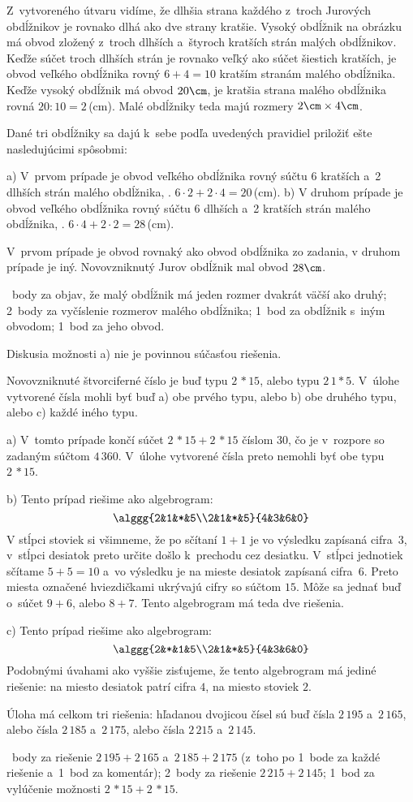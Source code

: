 {%
Z~vytvoreného útvaru vidíme, že dlhšia strana každého z~troch Jurových
obdĺžnikov je rovnako dlhá ako dve strany kratšie.
Vysoký obdĺžnik na obrázku má obvod zložený z~troch dlhších a~štyroch kratších strán
malých obdĺžnikov.
Keďže súčet troch dlhších strán je rovnako veľký ako súčet šiestich kratších,
je obvod veľkého obdĺžnika rovný $6+4=10$ kratším stranám malého obdĺžnika.
Keďže vysoký obdĺžnik má obvod $20\cm$, je kratšia strana malého obdĺžnika
rovná $20:10=2$\,(cm).
Malé obdĺžniky teda majú rozmery $2\cm\times4\cm$.

Dané tri obdĺžniky sa dajú k~sebe podľa uvedených pravidiel priložiť ešte
nasledujúcimi spôsobmi:
%

\ite a)
V~prvom prípade je obvod veľkého obdĺžnika rovný súčtu 6 kratších a~2
dlhších strán malého obdĺžnika, \tj. $6\cdot2+2\cdot4=20$\,(cm).
\ite b)
V druhom prípade je obvod veľkého obdĺžnika rovný súčtu 6 dlhších a~2
kratších strán malého obdĺžnika, \tj. $6\cdot4+2\cdot2=28$\,(cm).

\noindent
V~prvom prípade je obvod rovnaký ako obvod obdĺžnika zo zadania, v druhom
prípade je iný.
Novovzniknutý Jurov obdĺžnik mal obvod $28\cm$.

~body za objav, že malý obdĺžnik má jeden rozmer dvakrát väčší ako druhý;
2~body za vyčíslenie rozmerov malého obdĺžnika;
1~bod za obdĺžnik s~iným obvodom;
1~bod za jeho obvod.

Diskusia možnosti a) nie je povinnou súčasťou riešenia.
\endhodnotenie
}

{%
Novovzniknuté štvorciferné číslo je buď typu $2\,{*}15$, alebo typu $2\,1{*}5$.
V~úlohe vytvorené čísla mohli byť buď a) obe prvého typu, alebo b) obe druhého typu, alebo c) každé iného typu.

a) V~tomto prípade končí súčet $2\,{*}15+2\,{*}15$ číslom $30$, čo je v~rozpore so
zadaným súčtom $4\,360$.
V~úlohe vytvorené čísla preto nemohli byť obe typu $2\,{*}15$.

b) Tento prípad riešime ako algebrogram:
$$
\alggg{2&1&*&5\\2&1&*&5}{4&3&6&0}
$$
V stĺpci stoviek si všimneme, že po sčítaní $1+1$ je vo výsledku zapísaná
cifra~$3$, v~stĺpci desiatok preto určite došlo k~prechodu cez desiatku.
V~stĺpci jednotiek sčítame $5+5=10$ a~vo výsledku je na mieste desiatok
zapísaná cifra~$6$.
Preto miesta označené hviezdičkami ukrývajú cifry so súčtom $15$.
Môže sa jednať buď o~súčet $9+6$, alebo $8+7$.
Tento algebrogram má teda dve riešenia.

c) Tento prípad riešime ako algebrogram:
$$
\alggg{2&*&1&5\\2&1&*&5}{4&3&6&0}
$$
Podobnými úvahami ako vyššie zisťujeme, že tento algebrogram má jediné
riešenie: na miesto desiatok patrí cifra $4$, na miesto stoviek $2$.

\smallskip
Úloha má celkom tri riešenia:
hľadanou dvojicou čísel sú buď čísla $2\,195$ a~$2\,165$, alebo čísla $2\,185$ a~$2\,175$,
alebo čísla $2\,215$ a~$2\,145$.

~body za riešenie $2\,195+2\,165$ a~$2\,185+2\,175$ (z~toho po 1~bode za každé riešenie a~1~bod za komentár);
2~body za riešenie $2\,215+2\,145$;
1~bod za vylúčenie možnosti $2\,*15+2\,*15$.
\endhodnotenie
}

